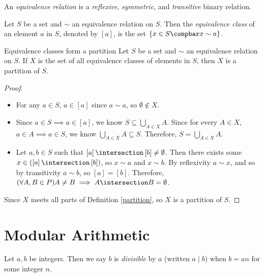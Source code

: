 \documentclass[12pt]{article}
\begin{document}
\begin{defn}\label{equivalence-relation}
    An \emph{equivalence relation} is a \emph{reflexive}, \emph{symmetric}, and \emph{transitive} binary relation.
\end{defn}

\begin{defn}\label{equivalence-class}
    Let $S$ be a set and $\sim$ an equivalence relation on $S$. Then the \emph{equivalence class} of an element $a$ in $S$, denoted by $\left[a\right]$, is the set $\left\{x \in S \compbar x \sim a\right\}$.
\end{defn}

\begin{thm}{Equivalence classes form a partition}\proofbreak
    Let $S$ be a set and $\sim$ an equivalence relation on $S$. If $X$ is the set of all equivalence classes of elements in $S$, then $X$ is a partition of $S$.
\end{thm}

\begin{proof}\proofbreak
    \begin{itemize}
        \item For any $a \in S$, $a \in \left[a\right]$ since $a \sim a$, so $\emptyset \notin X$.
        \item Since $a \in S \implies a \in \left[a\right]$, we know $S \subseteq \bigcup_{A\in X}A$. Since for every $A \in X$, $a \in A \implies a \in S$, we know $\bigcup_{A\in X}A \subseteq S$. Therefore, $S = \bigcup_{A\in X}A$.
        \item Let $a, b \in S$ such that $\left[a\right] \intersection \left[b\right] \neq \emptyset$. Then there exists some $x \in (\left[a\right] \intersection \left[b\right])$, so $x \sim a$ and $x \sim b$. By reflexivity $a \sim x$, and so by transitivity $a \sim b$, so $\left[a\right] = \left[b\right]$. Therefore, $(\forall A, B \in P) A \neq B \implies A \intersection B = \emptyset$.
    \end{itemize}
    Since $X$ meets all parts of Definition \ref{partition}, so $X$ is a partition of $S$.
\end{proof}

\section{Modular Arithmetic}

\begin{defn}\label{divisible}
    Let $a, b$ be integers. Then we say $b$ is \emph{divisible} by $a$ (written $a \mid b$) when $b = an$ for some integer $n$.
\end{defn}
\end{document}
